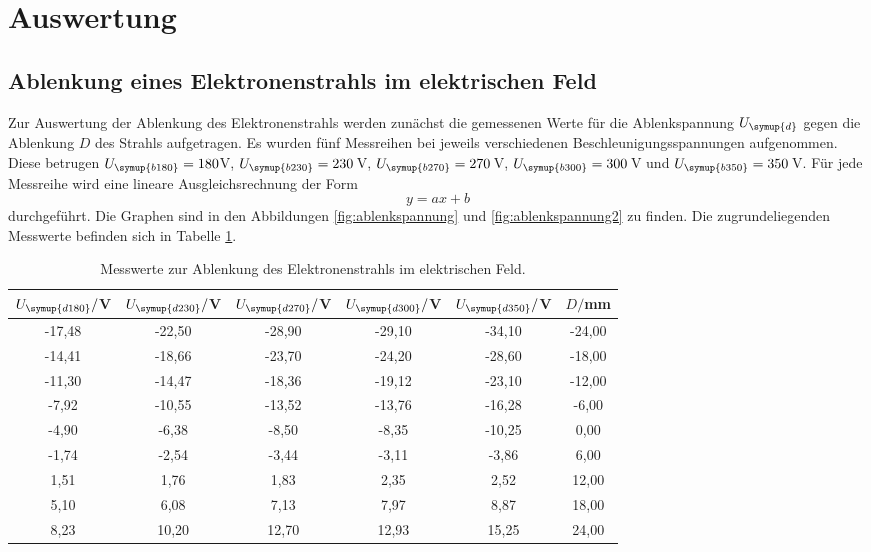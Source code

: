\section{Auswertung}
\label{sec:Auswertung}


\subsection{Ablenkung eines Elektronenstrahls im elektrischen Feld}
\label{subsec:efeld}


Zur Auswertung der Ablenkung des Elektronenstrahls werden zunächst die gemessenen Werte
für die Ablenkspannung $U_{\symup{d}}$ gegen die Ablenkung $D$ des Strahls aufgetragen.
Es wurden fünf Messreihen bei jeweils verschiedenen Beschleunigungsspannungen aufgenommen.
Diese betrugen $U_{\symup{b180}}=180$V, $U_{\symup{b230}}=230\,$V, $U_{\symup{b270}}=270\,$V,
$U_{\symup{b300}}=300\,$V und $U_{\symup{b350}}=350\,$V.
Für jede Messreihe wird eine lineare Ausgleichsrechnung der Form
\begin{equation*}
  y=a x + b
\end{equation*}
durchgeführt. Die Graphen sind in den Abbildungen \ref{fig:ablenkspannung} und
\ref{fig:ablenkspannung2} zu finden. Die zugrundeliegenden Messwerte befinden sich
in Tabelle \ref{tab:elektrisch}.

\begin{table}[h]
	\begin{center}
    \caption{Messwerte zur Ablenkung des Elektronenstrahls im elektrischen Feld.}
    \label{tab:elektrisch}
		\begin{tabular}{cccccc}
		\toprule
			{$U_{\symup{d180}}/$V} & {$U_{\symup{d230}}/$V} & {$U_{\symup{d270}}/$V} & {$U_{\symup{d300}}/$V} & {$U_{\symup{d350}}/$V} & {$D/$mm}\\
			\midrule
			-17,48 & -22,50 & -28,90 & -29,10 & -34,10 & -24,00\\
			-14,41 & -18,66 & -23,70 & -24,20 & -28,60 & -18,00\\
			-11,30 & -14,47 & -18,36 & -19,12 & -23,10 & -12,00\\
			-7,92 & -10,55 & -13,52 & -13,76 & -16,28 & -6,00\\
			-4,90 & -6,38 & -8,50 & -8,35 & -10,25 & 0,00\\
			-1,74 & -2,54 & -3,44 & -3,11 & -3,86 & 6,00\\
			1,51 & 1,76 & 1,83 & 2,35 & 2,52 & 12,00\\
			5,10 & 6,08 & 7,13 & 7,97 & 8,87 & 18,00\\
			8,23 & 10,20 & 12,70 & 12,93 & 15,25 & 24,00\\
		\bottomrule
		\end{tabular}
	\end{center}
\end{table}

